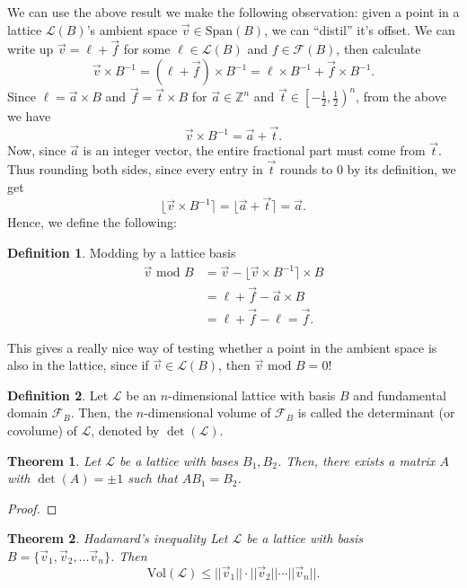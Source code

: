 \documentclass{article}
\newtheorem{theorem}{Theorem}[section]
\theoremstyle{definition}
\newtheorem{definition}{Definition}[section]
\theoremstyle{example}
\newcommand{\Vol}{\text{Vol}}
\renewcommand{\L}{\mathcal{L}}
\newcommand{\F}{\mathcal{F}}
\newcommand{\Int}{\mathbb{Z}}
\newcommand{\Span}{\text{Span}}
\renewcommand{\mod}{\,\,\text{mod}\,\,}
\newcommand{\norm}[1]{||#1||}
\begin{document}
We can use the above result we make the following observation: given a point in
a lattice $\L(B)$'s ambient space $\vec{v} \in \Span(B)$, we can ``distil''
it's offset. We can write up $\vec{v} = \ell + \vec{f}$ for some $\ell\in
\L(B)$ and $f \in \F(B)$, then calculate
\[
  \vec{v}\times B^{-1} = (\ell + \vec{f}) \times B^{-1} = \ell\times B^{-1} +
  \vec{f}\times B^{-1}.
\]
Since $\ell = \vec{a} \times B$ and $\vec{f} = \vec{t} \times B$ for $\vec{a}
\in \Int^n$ and $\vec{t} \in \left[-\frac12, \frac12\right)^n$, from the above we have
\[
  \vec{v}\times B^{-1} = \vec{a} + \vec{t}.
\]
Now, since $\vec{a}$ is an integer vector, the entire fractional part must come
from $\vec{t}$. Thus rounding both sides, since every entry in $\vec{t}$ rounds
to 0 by its definition, we get
\[
  \lfloor \vec{v}\times B^{-1} \rceil = \lfloor \vec{a} + \vec{t} \rceil = \vec{a}.
\]
Hence, we define the following:
\begin{definition}{Modding by a lattice basis}
  \label{def:lattice_mod}
  \begin{align*}
    \vec{v} \mod B &= \vec{v} - \lfloor \vec{v} \times B^{-1} \rceil \times B \\
                   &= \ell + \vec{f} - \vec{a} \times B \\
                   &= \ell + \vec{f} - \ell = \vec{f}.
  \end{align*}
\end{definition}
This gives a really nice way of testing whether a point in the ambient space is
also in the lattice, since if $\vec{v} \in \L(B)$, then $\vec{v} \mod B = 0$!
\begin{definition}
  Let $\L$ be an $n$-dimensional lattice with basis $B$ and fundamental domain
  $\F_B$. Then, the $n$-dimensional volume of $\F_B$ is called the determinant
  (or covolume) of $\L$, denoted by $\det(\L)$.
\end{definition}
\begin{theorem}
  \label{thm:lattice_change_of_basis}
  Let $\L$ be a lattice with bases $B_1, B_2$. Then, there exists a matrix $A$
  with $\det(A) = \pm 1$ such that $AB_1 = B_2$.
\end{theorem}
\begin{proof}
\end{proof}
\begin{theorem}{Hadamard's inequality}
  Let $\L$ be a lattice with basis $B = \{\vec{v}_1, \vec{v}_2, \hdots \vec{v}_n\}$. Then
\[
  \Vol(\L) \leq \norm{\vec{v}_1}\cdot\norm{\vec{v}_2}\cdots\norm{\vec{v}_n}.
\]
\end{theorem}
\end{document}
